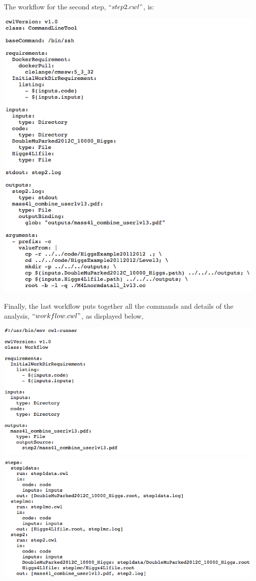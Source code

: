 \documentclass[letter]{article}
\begin{document}
\vspace{5pt} The workflow for the second step, $``step2.cwl"$, is:
\begin{center}
\includegraphics[scale=0.5]{step2}
\end{center}
Finally, the last workflow puts together all the commands and details of the analysis, $``workflow.cwl"$, as displayed below,
\begin{center}
\includegraphics[scale=0.5]{work1}
\includegraphics[scale=0.5]{work2}
\end{center}
\end{document}
